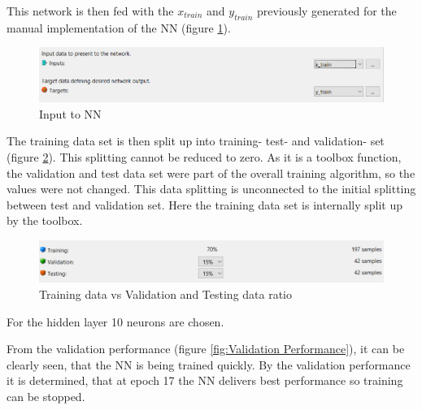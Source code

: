 This network is then fed with the $x_{train}$ and $y_{train}$ previously generated for the manual implementation of the NN (figure \ref{fig:NNinput}). 

\begin{figure}[H]
	\centering
	\includegraphics[width=1.0\columnwidth]{Pictures/Input to NN.png}
	\caption[Short title]{Input to NN}
	\label{fig:NNinput}
	\end{figure}

The training data set is then split up into training- test- and validation- set (figure \ref{fig:Trainingvs}). This splitting cannot be reduced to zero. As it is a toolbox function, the validation and test data set were part of the overall training algorithm, so the values were not changed. This data splitting is unconnected to the initial splitting between test and validation set. Here the training data set is internally split up by the toolbox.

\begin{figure}[H]
	\centering
	\includegraphics[width=1.0\columnwidth]{Pictures/Training data vs Validation and Testing data ratio.png}
	\caption[Short title]{Training data vs Validation and Testing data ratio}
	\label{fig:Trainingvs}
	\end{figure}

For the hidden layer 10 neurons are chosen.

From the validation performance (figure \ref{fig:Validation Performance}), it can be clearly seen, that the NN is being trained quickly. By the validation performance it is determined, that at epoch 17 the NN delivers best performance so training can be stopped.

